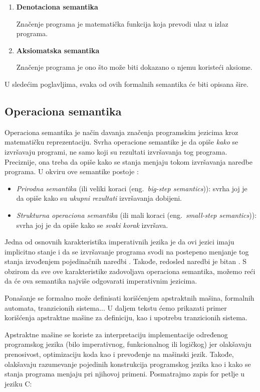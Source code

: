 \documentclass[a4paper]{article}
\begin{document}
{\begin{enumerate}
  Značenje programa predstavlja tok koraka izvršavanja programa sa datim ulazom.
  \item \textbf{Denotaciona semantika}

  Značenje programa je matematička funkcija koja prevodi ulaz u izlaz programa.
  \item \textbf{Aksiomatska semantika}

  Značenje programa je ono što može biti dokazano o njemu koristeći aksiome.
\end{enumerate}

U sledećim poglavljima, svaka od ovih formalnih semantika će biti opisana šire.
\subsection{Operaciona semantika}
\label{sec:opsem}

\qquad Operaciona semantika je način davanja značenja programskim jezicima kroz matematičku reprezentaciju. Svrha operacione semantike je da opiše \textit{kako} se izvršavaju programi, ne samo koji su rezultati izvršavanja tog programa. Preciznije, ona treba da opiše kako se stanja menjaju tokom izvršavanja naredbe programa. U okviru ove semantike postoje  \cite{wiley}:
\begin{itemize}
	\item \textit{Prirodna semantika} (ili veliki koraci (eng.~{\em big-step semantics})): svrha joj je da opiše kako su \textit{ukupni rezultati} izvršavanja dobijeni.
	\item \textit{Strukturna operaciona semantika} (ili mali koraci (eng.~{\em small-step semantics})): svrha joj je da opiše kako se \textit{svaki korak} izvršava.
\end{itemize}

Jedna od osnovnih karakteristika imperativnih jezika je da ovi jezici imaju implicitno stanje i da se izvršavanje programa svodi na postepeno menjanje tog stanja izvođenjem pojedinačnih naredbi \cite{milena2}. Takođe, redosled naredbi je bitan \cite{milena2}. S obzirom da sve ove karakteristike zadovoljava operaciona semantika, možemo reći da će ova semantika najviše odgovarati imperativnim jezicima. 


Ponašanje se formalno može definisati korišćenjem apstraktnih mašina, formalnih automata, tranzicionih sistema... U daljem tekstu ćemo prikazati primer korišćenja apstraktne mašine za definiciju, kao i upotrebu tranzicionih sistema.

Apstraktne mašine se koriste za interpretaciju implementacije određenog programskog jezika (bilo imperativnog, funkcionalnog ili logičkog) jer olakšavaju prenosivost, optimizaciju koda kao i prevođenje na mašinski jezik. Takođe, olakšavaju razumevanje pojedinih konstrukcija programskog jezika kao i kako se stanja programa menjaju pri njihovoj primeni. Posmatrajmo zapis for petlje u jeziku C:

}
\end{document}
